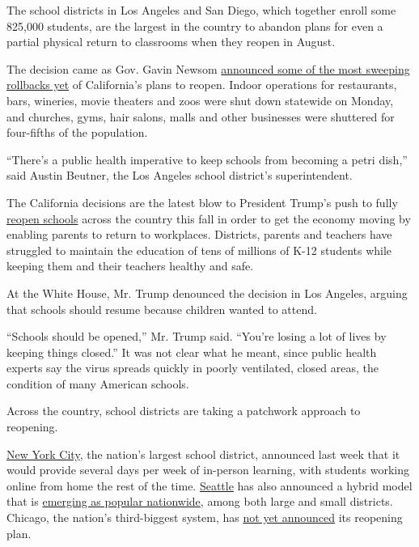 The school districts in Los Angeles and San Diego, which together enroll
some 825,000 students, are the largest in the country to abandon plans
for even a partial physical return to classrooms when they reopen in
August.

The decision came as Gov. Gavin Newsom
\href{https://twitter.com/GavinNewsom/status/1282752861835649024?s=20}{announced
some of the most sweeping rollbacks yet} of California's plans to
reopen. Indoor operations for restaurants, bars, wineries, movie
theaters and zoos were shut down statewide on Monday, and churches,
gyms, hair salons, malls and other businesses were shuttered for
four-fifths of the population.

``There's a public health imperative to keep schools from becoming a
petri dish,'' said Austin Beutner, the Los Angeles school district's
superintendent.

The California decisions are the latest blow to President Trump's push
to fully
\href{https://www.nytimes.com/interactive/2020/07/31/us/coronavirus-school-reopening-risk.html}{reopen
schools} across the country this fall in order to get the economy moving
by enabling parents to return to workplaces. Districts, parents and
teachers have struggled to maintain the education of tens of millions of
K-12 students while keeping them and their teachers healthy and safe.

At the White House, Mr. Trump denounced the decision in Los Angeles,
arguing that schools should resume because children wanted to attend.

``Schools should be opened,'' Mr. Trump said. ``You're losing a lot of
lives by keeping things closed.'' It was not clear what he meant, since
public health experts say the virus spreads quickly in poorly
ventilated, closed areas, the condition of many American schools.

Across the country, school districts are taking a patchwork approach to
reopening.

\href{https://www.nytimes.com/2020/07/08/nyregion/nyc-schools-reopening-plan.html}{New
York City}, the nation's largest school district, announced last week
that it would provide several days per week of in-person learning, with
students working online from home the rest of the time.
\href{https://www.seattleschools.org/district/calendars/news/what_s_new/coronavirus_update}{Seattle}
has also announced a hybrid model that is
\href{https://www.nytimes.com/2020/06/26/us/coronavirus-schools-reopen-fall.html}{emerging
as popular nationwide}, among both large and small districts. Chicago,
the nation's third-biggest system, has
\href{https://chicago.chalkbeat.org/2020/7/9/21319042/six-things-to-watch-as-chicago-weighs-reopening-school-buildings-this-fall}{not
yet announced} its reopening plan.

